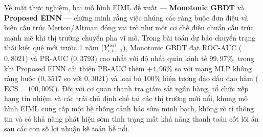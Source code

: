 \documentclass[11pt,a4paper]{article}
\begin{document}
Về mặt thực nghiệm, hai mô hình EIML đề xuất --- \textbf{Monotonic GBDT} và \textbf{Proposed EINN} --- chứng minh rằng việc nhúng các ràng buộc đơn điệu và biên cấu trúc Merton/Altman đóng vai trò như một cơ chế điều chuẩn cấu trúc mạnh mẽ khi thị trường chuyển pha vĩ mô. Trong bài toán dự báo chuyển trạng thái kiệt quệ mới trước 1 năm ($Y_{i,t+1}^{\text{fwd}}$), Monotonic GBDT đạt $\text{ROC-AUC}$ ($0,8021$) và $\text{PR-AUC}$ ($0,3793$) cao nhất với độ nhất quán kinh tế $99,97\%$, trong khi Proposed EINN cải thiện $\text{PR-AUC}$ thêm $+4,96\%$ so với mạng MLP không ràng buộc ($0,3517$ so với $0,3021$) và loại bỏ $100\%$ hiện tượng đảo dấu đạo hàm ($\text{ECS} = 100,00\%$). Đối với cơ quan thanh tra giám sát ngân hàng, tổ chức xếp hạng tín nhiệm và các trái chủ định chế tại các thị trường mới nổi, khung mô hình EIML cung cấp một hệ thống cảnh báo sớm minh bạch, không rò rỉ thông tin và có khả năng phát hiện sớm tình trạng mất khả năng thanh toán cốt lõi ẩn sau các con số lợi nhuận kế toán bề nổi.

\selectfont


\end{document}
